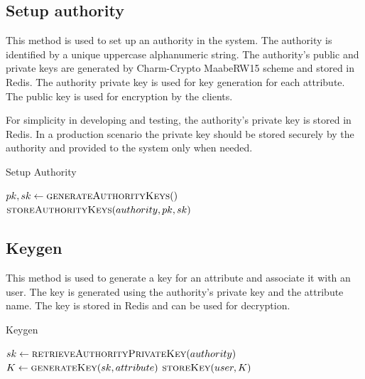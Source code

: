 \documentclass[cic,tc,english]{iiufrgs}
\begin{document}
        \subsection{Setup authority}
            This method is used to set up an authority in the system. The authority is identified by a unique uppercase alphanumeric string. The authority's public and private keys are generated by Charm-Crypto MaabeRW15\cite{rouselakis2015efficient} scheme and stored in Redis. The authority private key is used for key generation for each attribute. The public key is used for encryption by the clients.

            For simplicity in developing and testing, the authority's private key is stored in Redis. In a production scenario the private key should be stored securely by the authority and provided to the system only when needed.

            \begin{algorithm}
                \caption{Setup Authority}
                \label{alg:setup_authority}
                \begin{algorithmic}[1]
                    \State $pk, sk \gets \textsc{generateAuthorityKeys}()$
                    \State $\textsc{storeAuthorityKeys}(authority, pk, sk)$
                \EndProcedure
                \end{algorithmic}
            \end{algorithm}

        \subsection{Keygen}
            This method is used to generate a key for an attribute and associate it with an user. The key is generated using the authority's private key and the attribute name. The key is stored in Redis and can be used for decryption.

            \begin{algorithm}
                \caption{Keygen}
                \label{alg:keygen}
                \begin{algorithmic}[1]
                    \State $sk \gets \textsc{retrieveAuthorityPrivateKey}(authority)$
                    \State $K \gets \textsc{generateKey}(sk, attribute)$
                    \State $\textsc{storeKey}(user, K)$
                \EndProcedure
                \end{algorithmic}
            \end{algorithm}
\end{document}

